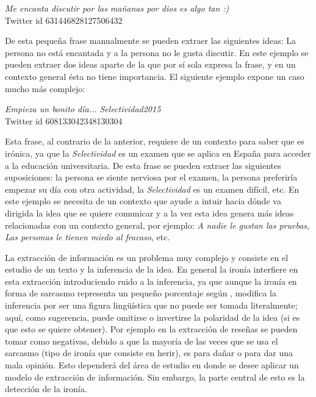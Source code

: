 \begin{center}
	\textit{Me encanta discutir por las mañanas por dios es algo tan :)}\\[6pt]
	\footnotesize{Twitter id 631446828127506432}
\end{center}


\par De esta pequeña frase manualmente se pueden extraer las siguientes ideas: La persona no está encantada y a la persona no le gusta discutir. En este ejemplo se pueden extraer dos ideas aparte de la que por sí sola expresa la frase, y en un contexto general ésta no tiene importancia. El siguiente ejemplo expone un caso mucho más complejo:

\begin{center}
	\textit{Empieza un bonito día...  Selectividad2015}\\[6pt]
	\footnotesize{Twitter id 608133042348130304}
\end{center}


\par Esta frase, al contrario de la anterior, requiere de un contexto para saber que es irónica, ya que la \textit{Selectividad} es un examen que se aplica en España para acceder a la educación universitaria. De esta frase se pueden extraer las siguientes suposiciones: la persona se siente nerviosa por el examen, la persona preferiría empezar su día con otra actividad, la \textit{Selectividad} es un examen difícil, etc. En este ejemplo se necesita de un contexto que ayude a intuir hacia dónde va dirigida la idea que se quiere comunicar y a la vez esta idea genera más ideas relacionadas con un contexto general, por ejemplo: \textit{A nadie le gustan las pruebas}, \textit{Las personas le tienen miedo al fracaso}, etc.

\par La extracción de información es un problema muy complejo y consiste en el estudio de un texto y la inferencia de la idea. En general la ironía interfiere en esta extracción introduciendo ruido a la inferencia, ya que aunque la ironía en forma de sarcasmo representa un pequeño porcentaje según \textcite{liu2007low}, modifica la inferencia por ser una figura lingüística que no puede ser tomada literalmente; aquí, como sugerencia, puede omitirse o invertirse la polaridad de la idea (si es que esto se quiere obtener). Por ejemplo en la extracción de reseñas se pueden tomar como negativas, debido a que la mayoría de las veces que se usa el sarcasmo (tipo de ironía que consiste en herir), es para dañar o para dar una mala opinión. Esto dependerá del área de estudio en donde se desee aplicar un modelo de extracción de información. Sin embargo, la parte central de esto es la detección de la ironía.

